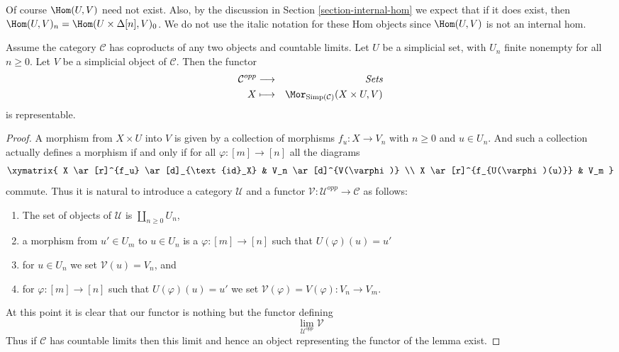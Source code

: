 \noindent
Of course $\Hom(U, V)$ need not exist.
Also, by the discussion in Section \ref{section-internal-hom}
we expect that if it does exist, then
$\Hom(U, V)_n = \Hom(U \times \Delta[n], V)_0$.
We do not use the italic notation for these Hom objects
since $\Hom(U, V)$ is not an internal hom.

\begin{lemma}
\label{lemma-exists-hom-0-from-simplicial-set}
Assume the category $\mathcal{C}$
has coproducts of any two objects and countable
limits. Let $U$ be a simplicial set, with $U_n$ finite nonempty
for all $n \geq 0$.
Let $V$ be a simplicial object of $\mathcal{C}$.
Then the functor
\begin{eqnarray*}
\mathcal{C}^{opp} & \longrightarrow & \textit{Sets} \\
X
& \longmapsto &
\Mor_{\text{Simp}(\mathcal{C})}(X \times U, V)
\end{eqnarray*}
is representable.
\end{lemma}

\begin{proof}
A morphism from $X \times U$ into $V$ is given by a collection
of morphisms $f_u : X \to V_n$ with $n \geq 0$ and $u \in U_n$.
And such a collection actually defines a morphism if and only
if for all $\varphi : [m] \to [n]$ all the diagrams
$$
\xymatrix{
X \ar[r]^{f_u} \ar[d]_{\text{id}_X} & V_n \ar[d]^{V(\varphi)} \\
X \ar[r]^{f_{U(\varphi)(u)}} & V_m
}
$$
commute. Thus it is natural to introduce a category
$\mathcal{U}$ and a functor
$\mathcal{V} : \mathcal{U}^{opp} \to \mathcal{C}$
as follows:
\begin{enumerate}
\item The set of objects of $\mathcal{U}$ is
$\coprod_{n \geq 0} U_n$,
\item a morphism from $u' \in U_m$ to $u \in U_n$
is a $\varphi : [m] \to [n]$ such that $U(\varphi)(u) = u'$
\item for $u \in U_n$ we set $\mathcal{V}(u) = V_n$, and
\item for $\varphi : [m] \to [n]$ such that $U(\varphi)(u) = u'$
we set $\mathcal{V}(\varphi) = V(\varphi) : V_n \to V_m$.
\end{enumerate}
At this point it is clear that our functor is nothing but the
functor defining
$$
\lim_{\mathcal{U}^{opp}} \mathcal{V}
$$
Thus if $\mathcal{C}$ has countable limits then this limit
and hence an object representing the functor of the lemma
exist.
\end{proof}

